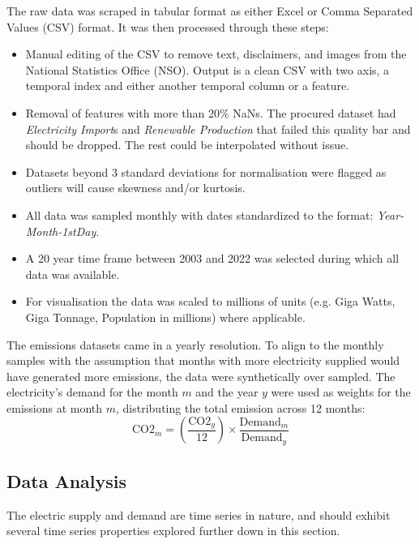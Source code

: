 \documentclass{ieeeaccess}
\begin{document}
The raw data was scraped in tabular format as either Excel or Comma Separated Values (CSV) format. It was then processed through these steps:
\begin{itemize}
    \item Manual editing of the CSV to remove text, disclaimers, and images from the National Statistics Office (NSO). Output is a clean CSV with two axis, a temporal index and either another temporal column or a feature.
    \item Removal of features with more than 20\% NaNs. The procured dataset had \textit{Electricity Import}s and \textit{Renewable Production} that failed this quality bar and should be dropped. The rest could be interpolated without issue. 
    \item Datasets beyond 3 standard deviations for normalisation were flagged as outliers will cause skewness and/or kurtosis. 
    \item All data was sampled monthly with dates standardized to the format: \textit{Year-Month-1stDay}.
    \item A 20 year time frame between 2003 and 2022 was selected during which all data was available.
    \item For visualisation the data was scaled to millions of units (e.g. Giga Watts, Giga Tonnage, Population in millions) where applicable.
\end{itemize}

The emissions datasets came in a yearly resolution. To align to the monthly samples with the assumption that months with more electricity supplied would have generated more emissions, the data were synthetically over sampled. The electricity's demand for the month $m$ and the year $y$ were used as weights for the emissions at month $m$, distributing the total emission across 12 months:
\begin{equation}
    \text{CO2}_m = \left( \frac{\text{CO2}_y}{12} \right) \times \frac{\text{Demand}_m}{\text{Demand}_y}
\end{equation}

\subsection{Data Analysis} \label{sec:DataAnalysis}

The electric supply and demand are time series in nature, and should exhibit several time series properties explored further down in this section.
\end{document}
